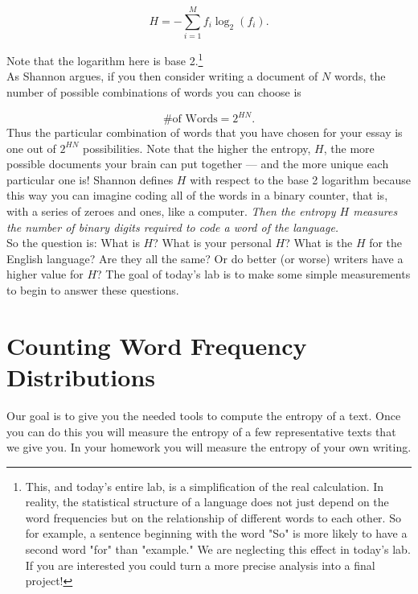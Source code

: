 \documentclass[12pt]{amsart}
\begin{document}
\begin{equation}\label{entropy}
H = - \sum_{i = 1}^M f_i \log_2 (f_i).
\end{equation}

\noindent Note that the logarithm here is base 2.\footnote{This, and today's entire lab, is a simplification of the real calculation.  In reality, the statistical structure of a language does not just depend on the word frequencies but on the relationship of different words to each other.  So for example, a sentence beginning with the word "So" is more likely to have a second word "for" than "example."  We are neglecting this effect in today's lab.  If you are interested you could turn a more precise analysis into a final project!  }\\

\noindent As Shannon argues, if you then consider writing a document of $N$ words, the number of possible combinations of words you can choose is
 
 \[
\# \textrm{of Words} = 2^{H N}.
\]
Thus the particular combination of words that you have chosen for your essay is one out of  $2^{HN}$ possibilities.  Note that the higher the entropy, $H$, the more possible documents your brain can put together --- and the more unique each particular one is!  Shannon defines $H$ with respect to the base 2 logarithm because this way you can imagine coding all of the words in a binary counter, that is, with a series of zeroes and ones, like a computer.  \textit{Then the entropy $H$ measures the number of binary digits required to code a word of the language.}\\

\noindent So the question is:  What is $H$?  What is your personal $H$?  What is the $H$ for the English language?  Are they all the same?  Or do better (or worse) writers have a higher value for $H$?  The goal of today's lab is to make some simple measurements to begin to answer these questions.

\section{Counting Word Frequency Distributions}

\noindent Our goal is to give you the needed tools to compute the entropy of a text.  Once you can do this you will measure the entropy of a few representative texts that we give you.  In your homework you will measure the entropy of your own writing.\\
\end{document}
